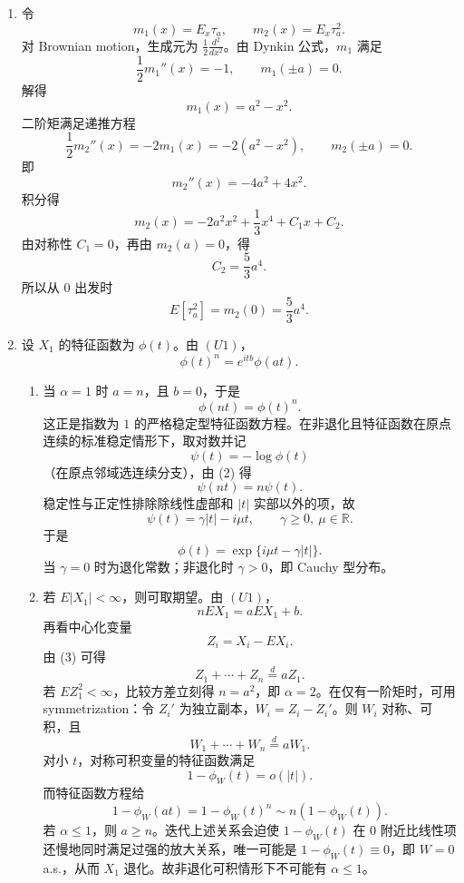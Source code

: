 \documentclass[UTF8,12pt]{ctexart}
\begin{document}
\begin{enumerate}[label=\textbf{\arabic*.},leftmargin=2.2em]
\begin{enumerate}[label=\textbf{(\alph*)},leftmargin=2.4em]
\item 令
\[
Y\sim f(x)=2\varphi(x)\Phi(ax).
\]
这是形状参数为 \(a\) 的 skew-normal 分布。直接计算：
\[
E(Y)=2\int_{-\infty}^{\infty}x\varphi(x)\Phi(ax)\,dx.
\]
分部积分，利用 \(\varphi'(x)=-x\varphi(x)\)，得
\[
\int x\varphi(x)\Phi(ax)\,dx
=-\int \Phi(ax)\,d\varphi(x)
=a\int \varphi(x)\varphi(ax)\,dx.
\]
而
\[
\int_{-\infty}^{\infty}\varphi(x)\varphi(ax)\,dx
=\frac1{2\pi}\int e^{-(1+a^2)x^2/2}\,dx
=\frac1{\sqrt{2\pi}}\frac1{\sqrt{1+a^2}}.
\]
故
\[
E(Y)=2a\cdot \frac1{\sqrt{2\pi}}\frac1{\sqrt{1+a^2}}
=\sqrt{\frac2\pi}\frac{a}{\sqrt{1+a^2}}.
\]
\end{enumerate}

\item 令
\[
m_1(x)=E_x\tau_a,\qquad m_2(x)=E_x\tau_a^2.
\]
对 Brownian motion，生成元为 \(\frac12\frac{d^2}{dx^2}\)。由 Dynkin 公式，\(m_1\) 满足
\[
\frac12m_1''(x)=-1,\qquad m_1(\pm a)=0.
\]
解得
\[
m_1(x)=a^2-x^2.
\]
二阶矩满足递推方程
\[
\frac12m_2''(x)=-2m_1(x)=-2(a^2-x^2),\qquad m_2(\pm a)=0.
\]
即
\[
m_2''(x)=-4a^2+4x^2.
\]
积分得
\[
m_2(x)=-2a^2x^2+\frac13x^4+C_1x+C_2.
\]
由对称性 \(C_1=0\)，再由 \(m_2(a)=0\)，得
\[
C_2=\frac53a^4.
\]
所以从 \(0\) 出发时
\[
E[\tau_a^2]=m_2(0)=\frac53a^4.
\]

\item 设 \(X_1\) 的特征函数为 \(\phi(t)\)。由 \((U1)\)，
\[
\phi(t)^n=e^{itb}\phi(at). \tag{1}
\]
\begin{enumerate}[label=\textbf{(\alph*)},leftmargin=2.4em]
\item 当 \(\alpha=1\) 时 \(a=n\)，且 \(b=0\)，于是
\[
\phi(nt)=\phi(t)^n. \tag{2}
\]
这正是指数为 \(1\) 的严格稳定型特征函数方程。在非退化且特征函数在原点连续的标准稳定情形下，取对数并记
\[
\psi(t)=-\log \phi(t)
\]
（在原点邻域选连续分支），由 (2) 得
\[
\psi(nt)=n\psi(t).
\]
稳定性与正定性排除除线性虚部和 \(|t|\) 实部以外的项，故
\[
\psi(t)=\gamma |t|-i\mu t,\qquad \gamma\ge0,\ \mu\in\mathbb R.
\]
于是
\[
\phi(t)=\exp\{i\mu t-\gamma |t|\}.
\]
当 \(\gamma=0\) 时为退化常数；非退化时 \(\gamma>0\)，即 Cauchy 型分布。

\item 若 \(E|X_1|<\infty\)，则可取期望。由 \((U1)\)，
\[
nE X_1=aE X_1+b. \tag{3}
\]
再看中心化变量
\[
Z_i=X_i-E X_i.
\]
由 (3) 可得
\[
Z_1+\cdots+Z_n\stackrel d=aZ_1.
\]
若 \(EZ_1^2<\infty\)，比较方差立刻得 \(n=a^2\)，即 \(\alpha=2\)。在仅有一阶矩时，可用 symmetrization：令 \(Z_i'\) 为独立副本，\(W_i=Z_i-Z_i'\)。则 \(W_i\) 对称、可积，且
\[
W_1+\cdots+W_n\stackrel d=aW_1.
\]
对小 \(t\)，对称可积变量的特征函数满足
\[
1-\phi_W(t)=o(|t|).
\]
而特征函数方程给
\[
1-\phi_W(at)=1-\phi_W(t)^n\sim n(1-\phi_W(t)).
\]
若 \(\alpha\le1\)，则 \(a\ge n\)。迭代上述关系会迫使 \(1-\phi_W(t)\) 在 \(0\) 附近比线性项还慢地同时满足过强的放大关系，唯一可能是 \(1-\phi_W(t)\equiv0\)，即 \(W=0\) a.s.，从而 \(X_1\) 退化。故非退化可积情形下不可能有 \(\alpha\le1\)。
\end{enumerate}


\end{enumerate}
\end{document}
